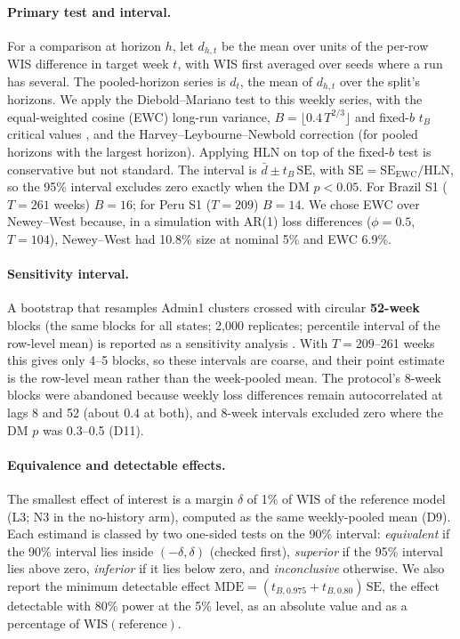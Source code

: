 \documentclass[11pt]{article}
\newcommand{\WIS}{\mathrm{WIS}}
\begin{document}
\paragraph{Primary test and interval.}
For a comparison at horizon $h$, let $d_{h,t}$ be the mean over units of the per-row WIS difference in
target week $t$, with WIS first averaged over seeds where a run has several. The pooled-horizon series
is $d_t$, the mean of $d_{h,t}$ over the split's horizons. We apply the Diebold--Mariano test
\citep{diebold1995comparing} to this weekly series, with the equal-weighted cosine (EWC) long-run
variance, $B=\lfloor 0.4\,T^{2/3}\rfloor$ and fixed-$b$ $t_B$ critical values \citep{lazarus2018har},
and the Harvey--Leybourne--Newbold correction \citep{harvey1997testing} (for pooled horizons with the
largest horizon). Applying HLN on top of the fixed-$b$ test is conservative but not standard. The
interval is $\bar d \pm t_{B}\,\mathrm{SE}$, with $\mathrm{SE}=\mathrm{SE}_{\mathrm{EWC}}/\mathrm{HLN}$,
so the 95\% interval excludes zero exactly when the DM $p<0.05$. For Brazil S1 ($T=261$ weeks) $B=16$; for
Peru S1 ($T=209$) $B=14$. We chose EWC over Newey--West because, in a simulation with AR(1) loss
differences ($\phi=0.5$, $T=104$), Newey--West had 10.8\% size at nominal 5\% and EWC 6.9\%.

\paragraph{Sensitivity interval.}
A bootstrap that resamples Admin1 clusters crossed with circular \textbf{52-week} blocks (the same blocks
for all states; 2{,}000 replicates; percentile interval of the row-level mean) is reported as a
sensitivity analysis \citep{kunsch1989jackknife,politis1992circular}. With $T=209$--261 weeks this gives only
4--5 blocks, so these intervals are coarse, and their point estimate is the row-level mean rather than the
week-pooled mean. The protocol's 8-week blocks were
abandoned because weekly loss differences remain autocorrelated at lags 8 and 52 (about 0.4 at both), and
8-week intervals excluded zero where the DM $p$ was 0.3--0.5 (D11).

\paragraph{Equivalence and detectable effects.}
The smallest effect of interest is a margin $\delta$ of 1\% of $\WIS$ of the reference model (L3; N3 in
the no-history arm), computed as the same weekly-pooled mean (D9). Each estimand is classed by two
one-sided tests on the 90\% interval: \emph{equivalent} if the 90\% interval lies inside
$(-\delta,\delta)$ (checked first), \emph{superior} if the 95\% interval lies above zero, \emph{inferior}
if it lies below zero, and \emph{inconclusive} otherwise. We also report the minimum detectable effect
$\mathrm{MDE}=(t_{B,0.975}+t_{B,0.80})\,\mathrm{SE}$, the effect detectable with 80\% power at the 5\%
level, as an absolute value and as a percentage of $\WIS(\text{reference})$.
\end{document}

